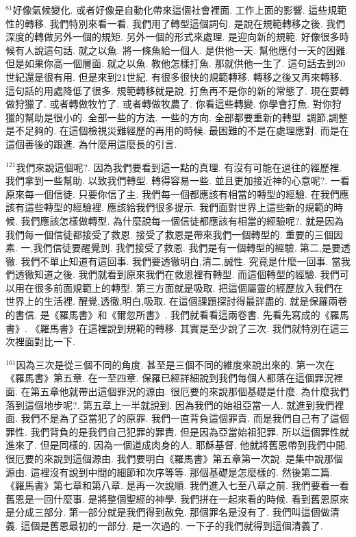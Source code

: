 \documentclass{book}
\begin{document}
$^{81}$好像氣候變化.
或者好像是自動化帶來這個社會裡面.
工作上面的影響.
這些規範性的轉移.
我們特別來看一看.
我們用了轉型這個詞句.
是說在規範轉移之後.
我們深度的轉做另外一個的規矩.
另外一個的形式來處理.
是迎向新的規範.
好像很多時候有人說這句話.
就之以魚.
將一條魚給一個人.
是供他一天.
幫他應付一天的困難.
但是如果你高一個層面.
就之以魚.
教他怎樣打魚.
那就供他一生了.
這句話去到20世紀還是很有用.
但是來到21世紀.
有很多很快的規範轉移.
轉移之後又再來轉移.
這句話的用處降低了很多.
規範轉移就是說.
打魚再不是你的新的常態了.
現在要轉做狩獵了.
或者轉做牧竹了.
或者轉做牧農了.
你看這些轉變.
你學會打魚.
對你狩獵的幫助是很小的.
全部一些的方法.
一些的方向.
全部都要重新的轉型.
調節,調整是不足夠的.
在這個檢視災難經歷的再用的時候.
最困難的不是在處理應對.
而是在這個善後的跟進.
為什麼用這麼長的引言.

$^{121}$我們來說這個呢?.
因為我們要看到這一點的真理.
有沒有可能在過往的經歷裡.
我們拿到一些幫助.
以致我們轉型.
轉得容易一些.
並且更加接近神的心意呢?.
一看原來每一個信徒.
只要你信了主.
我們每一個都應該有相當的轉型的經驗.
在我們應該有這些轉型的經驗裡.
應該給我們很多提示.
我們面對世界上這些新的規範的時候.
我們應該怎樣做轉型.
為什麼說每一個信徒都應該有相當的經驗呢?.
就是因為我們每一個信徒都接受了救恩.
接受了救恩是帶來我們一個轉型的.
重要的三個因素.
一,我們信徒要醒覺到.
我們接受了救恩.
我們是有一個轉型的經驗.
第二,是要透徹.
我們不單止知道有這回事.
我們要透徹明白,清二,誠性.
究竟是什麼一回事.
當我們透徹知道之後.
我們就看到原來我們在救恩裡有轉型.
而這個轉型的經驗.
我們可以用在很多前面規範上的轉型.
第三方面就是吸取.
把這個屬靈的經歷放入我們在世界上的生活裡.
醒覺,透徹,明白,吸取.
在這個課題探討得最詳盡的.
就是保羅兩卷的書信.
是《羅馬書》和《爾忽所書》.
我們就看看這兩卷書.
先看先寫成的《羅馬書》.
《羅馬書》在這裡說到規範的轉移.
其實是至少說了三次.
我們就特別在這三次裡面對比一下.

$^{161}$因為三次是從三個不同的角度.
甚至是三個不同的維度來說出來的.
第一次在《羅馬書》第五章.
在一至四章.
保羅已經詳細說到我們每個人都落在這個罪況裡面.
在第五章他就帶出這個罪況的源由.
很厄要的來說那個基礎是什麼.
為什麼我們落到這個地步呢?.
第五章上一半就說到.
因為我們的始祖亞當一人.
就進到我們裡面.
我們不是為了亞當犯了的原罪.
我們一直背負這個罪責.
而是我們自己有了這個罪性.
我們背負的是我們自己犯罪的罪責.
但是因為亞當始祖犯罪.
所以這個罪性就進來了.
但是同樣的.
因為一個道成肉身的人.
耶穌基督.
他就將舊恩帶到我們中間.
很厄要的來說到這個源由.
我們要明白《羅馬書》第五章第一次說.
是集中說那個源由.
這裡沒有說到中間的細節和次序等等.
那個基礎是怎麼樣的.
然後第二篇.
《羅馬書》第七章和第八章.
是再一次說順.
我們進入七至八章之前.
我們要看一看舊恩是一回什麼事.
是將整個聖經的神學.
我們拼在一起來看的時候.
看到舊恩原來是分成三部分.
第一部分就是我們得到赦免.
那個罪名是沒有了.
我們叫這個做清義.
這個是舊恩最初的一部分.
是一次過的.
一下子的我們就得到這個清義了.
\end{document}
